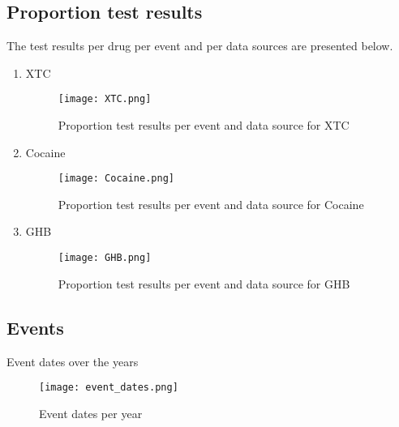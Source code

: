\subsection{Proportion test results}
The test results per drug per event and per data sources are presented below. 
\begin{enumerate}
    \item XTC
        \begin{figure*}[!htbp]
            \texttt{[image: XTC.png]}
            \caption{Proportion test results per event and data source for XTC}
            \label{fig:XTC}
        \end{figure*}
    \item Cocaine
        \begin{figure*}[!htbp]
            \texttt{[image: Cocaine.png]}
            \caption{Proportion test results per event and data source for Cocaine}
            \label{fig:Cocaine}
        \end{figure*}
    \item GHB
            \begin{figure*}[!htbp]
            \texttt{[image: GHB.png]}
            \caption{Proportion test results per event and data source for GHB}
            \label{fig:Cocaine}
        \end{figure*}
\end{enumerate}

\subsection{Events}
Event dates over the years
\begin{figure*}[h]
    \texttt{[image: event\_dates.png]}
    \caption{Event dates per year}
    \label{fig:event_dates}
\end{figure*}